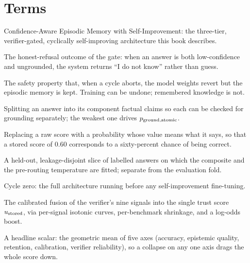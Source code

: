 \section{Terms}
\label{sec:glossary-terms}

\begin{description}[leftmargin=0pt, labelsep=0.6em, style=nextline]

\item[\caem{}] Confidence-Aware Episodic Memory with Self-Improvement: the three-tier,
verifier-gated, cyclically self-improving architecture this book describes.

\item[Abstain] The honest-refusal outcome of the gate: when an answer is both
low-confidence and ungrounded, the system returns ``I do not know'' rather than guess.

\item[Asymmetric rollback] The safety property that, when a cycle aborts, the model
weights revert but the episodic memory is kept. Training can be undone; remembered
knowledge is not.

\item[Atomic-fact decomposition] Splitting an answer into its component factual claims
so each can be checked for grounding separately; the weakest one drives $p_{\text{ground,atomic}}$.

\item[Calibration] Replacing a raw score with a probability whose value means what it
says, so that a stored score of $0.60$ corresponds to a sixty-percent chance of being
correct.

\item[Calibration fold] A held-out, leakage-disjoint slice of labelled answers on which
the composite and the pre-routing temperature are fitted; separate from the evaluation
fold.

\item[Cold start] Cycle zero: the full architecture running before any self-improvement
fine-tuning.

\item[Composite] The calibrated fusion of the verifier's nine signals into the single
trust score $u_{\text{stored}}$, via per-signal isotonic curves, per-benchmark shrinkage, and a
log-odds boost.

\item[Composite evaluation score (CES)] A headline scalar: the geometric mean of five
axes (accuracy, epistemic quality, retention, calibration, verifier reliability), so a
collapse on any one axis drags the whole score down.


\end{description}
